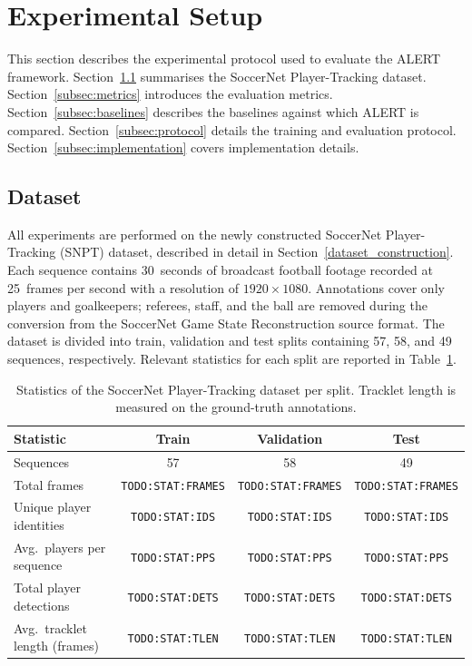 \section{Experimental Setup}\label{sec:experimental_setup}

This section describes the experimental protocol used to evaluate the ALERT framework.
Section~\ref{subsec:dataset} summarises the SoccerNet Player-Tracking dataset.
Section~\ref{subsec:metrics} introduces the evaluation metrics.
Section~\ref{subsec:baselines} describes the baselines against which ALERT is compared.
Section~\ref{subsec:protocol} details the training and evaluation protocol.
Section~\ref{subsec:implementation} covers implementation details.

\subsection{Dataset}\label{subsec:dataset}

All experiments are performed on the newly constructed SoccerNet Player-Tracking (SNPT) dataset, described in detail in Section~\ref{dataset_construction}. Each sequence contains 30~seconds of broadcast football footage recorded at 25~frames per second with a resolution of $1920\times1080$. Annotations cover only players and goalkeepers; referees, staff, and the ball are removed during the conversion from the SoccerNet Game State Reconstruction \cite{soccernetgsr} source format. The dataset is divided into train, validation and test splits containing 57, 58, and 49 sequences, respectively. Relevant statistics for each split are reported in Table~\ref{tab:dataset_stats}.

\begin{table}[H]
\centering
\begin{tabular}{lccc}
\toprule
\textbf{Statistic} & \textbf{Train} & \textbf{Validation} & \textbf{Test} \\
\midrule
Sequences                              & 57 & 58 & 49 \\
Total frames                           & \texttt{TODO:STAT:FRAMES}   & \texttt{TODO:STAT:FRAMES}   & \texttt{TODO:STAT:FRAMES}   \\
Unique player identities               & \texttt{TODO:STAT:IDS}      & \texttt{TODO:STAT:IDS}      & \texttt{TODO:STAT:IDS}      \\
Avg.\ players per sequence             & \texttt{TODO:STAT:PPS}      & \texttt{TODO:STAT:PPS}      & \texttt{TODO:STAT:PPS}      \\
Total player detections                & \texttt{TODO:STAT:DETS}     & \texttt{TODO:STAT:DETS}     & \texttt{TODO:STAT:DETS}     \\
Avg.\ tracklet length (frames)         & \texttt{TODO:STAT:TLEN}     & \texttt{TODO:STAT:TLEN}     & \texttt{TODO:STAT:TLEN}     \\
\bottomrule
\end{tabular}
\caption{Statistics of the SoccerNet Player-Tracking dataset per split. Tracklet length is measured on the ground-truth annotations.}
\label{tab:dataset_stats}
\end{table}

